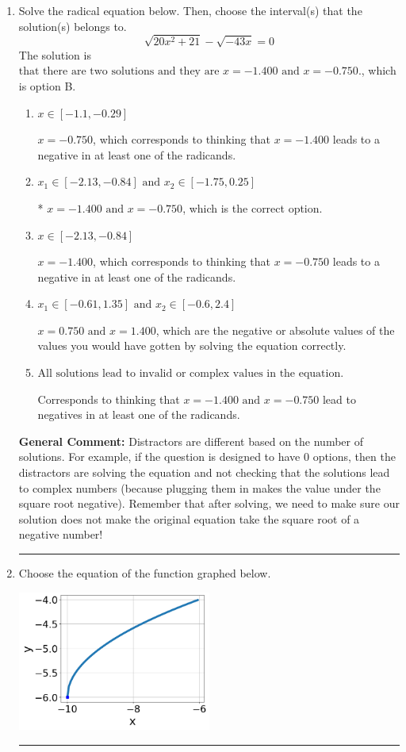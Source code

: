 \documentclass{extbook}[14pt]
\newcommand{\litem}[1]{\item #1

\rule{\textwidth}{0.4pt}}
\begin{document}
\begin{enumerate}\litem{
Solve the radical equation below. Then, choose the interval(s) that the solution(s) belongs to.
\[ \sqrt{20 x^2 + 21} - \sqrt{-43 x} = 0 \]The solution is \( \text{that there are two solutions and they are } x = -1.400 \text{ and } x = -0.750. \), which is option B.\begin{enumerate}[label=\Alph*.]
\item \( x \in [-1.1,-0.29] \)

$x = -0.750$, which corresponds to thinking that $x = -1.400$ leads to a negative in at least one of the radicands.
\item \( x_1 \in [-2.13, -0.84] \text{ and } x_2 \in [-1.75,0.25] \)

* $x = -1.400 \text{ and } x = -0.750$, which is the correct option.
\item \( x \in [-2.13,-0.84] \)

$x = -1.400$, which corresponds to thinking that $x = -0.750$ leads to a negative in at least one of the radicands.
\item \( x_1 \in [-0.61, 1.35] \text{ and } x_2 \in [-0.6,2.4] \)

$x = 0.750 \text{ and } x = 1.400$, which are the negative or absolute values of the values you would have gotten by solving the equation correctly.
\item \( \text{All solutions lead to invalid or complex values in the equation.} \)

Corresponds to thinking that $x = -1.400 \text{ and } x = -0.750$ lead to negatives in at least one of the radicands.
\end{enumerate}

\textbf{General Comment:} Distractors are different based on the number of solutions. For example, if the question is designed to have 0 options, then the distractors are solving the equation and not checking that the solutions lead to complex numbers (because plugging them in makes the value under the square root negative). Remember that after solving, we need to make sure our solution does not make the original equation take the square root of a negative number!
}
\litem{
Choose the equation of the function graphed below.

\begin{center}
    \includegraphics[width=0.5\textwidth]{../Figures/radicalGraphToEquationA.png}
\end{center}


}
\end{enumerate}
\end{document}

